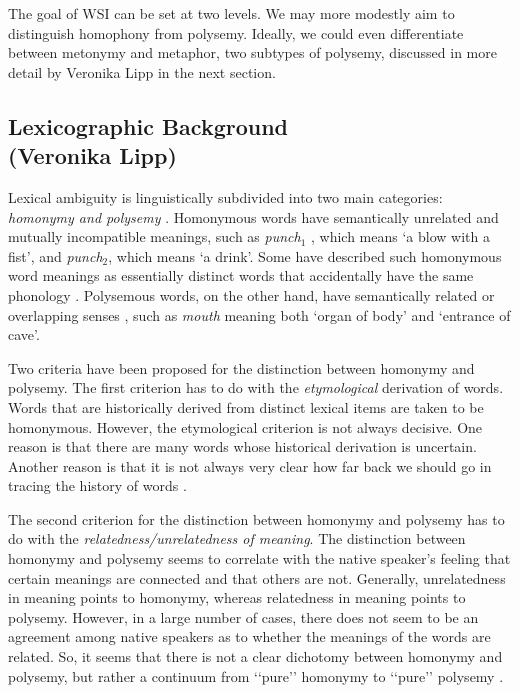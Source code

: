 \documentclass[11pt]{article}
\begin{document}

The goal of WSI can be set at two levels. We may more modestly aim to
distinguish homophony from polysemy. Ideally, we could even differentiate
between metonymy and metaphor, two subtypes of polysemy, discussed in more
detail by Veronika Lipp in the next section.

\subsection{Lexicographic Background \\ (Veronika Lipp)}

\label{sec:bground}

Lexical ambiguity is linguistically subdivided into two main categories:
\emph{homonymy and polysemy} \citep{Cruse:2004}. Homonymous words have
semantically unrelated and mutually incompatible meanings, such as
\emph{punch$_1$} , which means `a blow with a fist', and \emph{punch$_2$},
which means `a drink'. Some have described such homonymous word meanings as
essentially distinct words that accidentally have the same phonology
\citep{Murphy:2002}. Polysemous words, on the other hand, have semantically related
or overlapping senses \citep{Cruse:2004,Jackendoff:2002,Pustejovsky:1995},
such as \emph{mouth} meaning both `organ of body' and `entrance of cave'.

Two criteria have been proposed for the distinction between homonymy and
polysemy. The first criterion has to do with the \emph{etymological} derivation
of words. Words that are historically derived from distinct lexical items are
taken to be homonymous. However, the etymological criterion is not always
decisive. One reason is that there are many words whose historical derivation
is uncertain. Another reason is that it is not always very clear how far back
we should go in tracing the history of words \citep{Lyons:1977}.

The second criterion for the distinction between homonymy and polysemy has to
do with the \emph{relatedness/unrelatedness of meaning}.  The distinction
between homonymy and polysemy seems to correlate with the native speaker’s
feeling that certain meanings are connected and that others are not. Generally,
unrelatedness in meaning points to homonymy, whereas relatedness in meaning
points to polysemy.  However, in a large number of cases, there does not seem
to be an agreement among native speakers as to whether the meanings of the
words are related. So, it seems that there is not a clear dichotomy between
homonymy and polysemy, but rather a continuum from ‘‘pure’’ homonymy to
‘‘pure’’ polysemy \citep{Lyons:1977}.
\end{document}
